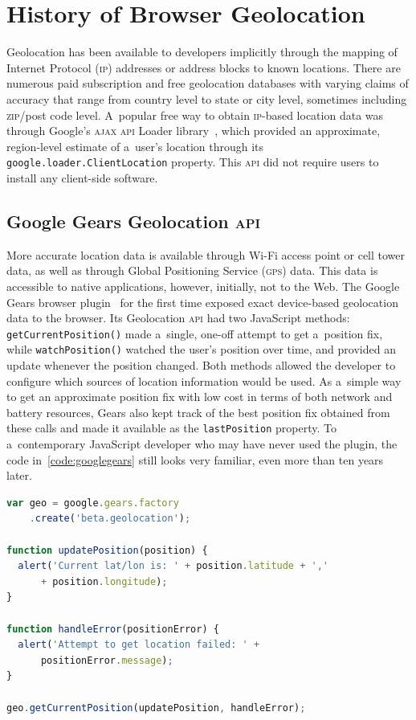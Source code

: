 \documentclass[sigconf,hyphens]{acmart}
\begin{document}
\section{History of Browser Geolocation}

Geolocation has been available to developers implicitly through the mapping of
Internet Protocol (\textsc{ip}) addresses or address blocks to known locations.
There are numerous paid subscription and free geolocation databases
with varying claims of accuracy that range from country level to state or city level,
sometimes including \textsc{zip}/post code level.
A~popular free way to obtain \textsc{ip}-based location data was
through Google's \textsc{ajax} \textsc{api} Loader library~\cite{block2008gears},
which provided an approximate, region-level estimate of a~user's location
through its \texttt{google.loader.ClientLocation} property.
This \textsc{api} did not require users to install any client-side software.

\subsection{Google Gears Geolocation \textsc{api}}
\label{sec:googlegears}

More accurate location data is available through Wi-Fi access point or cell tower data,
as well as through Global Positioning Service (\textsc{gps}) data.
This data is accessible to native applications, however, initially, not to the Web.
The Google Gears browser plugin~\cite{gears2008geolocation} for the first time exposed
exact device-based geolocation data to the browser. 
Its Geolocation \textsc{api} had two JavaScript methods:
\texttt{getCurrentPosition()} made a~single, one-off attempt to get a~position fix,
while \texttt{watchPosition()} watched the user's position over time,
and provided an update whenever the position changed.
Both methods allowed the developer to configure
which sources of location information would be used.
As a~simple way to get an approximate position fix with low cost
in terms of both network and battery resources,
Gears also kept track of the best position fix obtained from these calls
and made it available as the \texttt{lastPosition} property.
To a~contemporary JavaScript developer who may have never used the plugin,
the code in~\autoref{code:googlegears} still looks very familiar,
even more than ten years later.

\begin{lstlisting}[caption={Google Gears \textsc{api} (2008)},
  label=code:googlegears, language=JavaScript, float=h] 
var geo = google.gears.factory
    .create('beta.geolocation');

function updatePosition(position) {
  alert('Current lat/lon is: ' + position.latitude + ','
      + position.longitude);
}

function handleError(positionError) {
  alert('Attempt to get location failed: ' +
      positionError.message);
}

geo.getCurrentPosition(updatePosition, handleError);
\end{lstlisting} 
\end{document}
